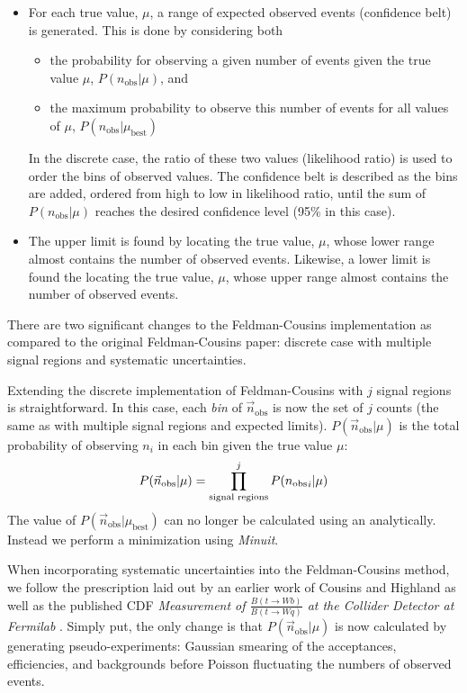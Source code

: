 \begin{itemize}

  \item For each true value, $\mu$, a range of expected observed
    events (confidence belt) is generated.  This is done by
    considering both 

    \begin{itemize}
    \item the probability for observing a given number of events given
      the true value  $\mu$, $P(n_\text{obs}|\mu)$, and

    \item the maximum probability to observe this number of events for
      all values of $\mu$, $P(n_\text{obs}|\mu_\text{best})$
    \end{itemize}

    In the discrete case, the ratio of these two values (likelihood
    ratio) is used to order the bins of observed values. The
    confidence belt is described as the bins are added, ordered from
    high to low in likelihood ratio, until the sum of
    $P(n_\text{obs}|\mu)$ reaches the desired confidence level (95\%
    in this case).

  \item The upper limit is found by locating the true value, $\mu$,
    whose lower range almost contains the number of observed events.
    Likewise, a lower limit is found the locating the true value,
    $\mu$, whose upper range almost contains the number of observed
    events.

\end{itemize}

There are two significant changes to the Feldman-Cousins
implementation as compared to the original Feldman-Cousins paper:
discrete case with multiple signal regions and systematic
uncertainties.

Extending the discrete implementation of Feldman-Cousins with $j$
signal regions is straightforward.  In this case, each {\em bin} of
$\vec{n}_\text{obs}$ is now the set of $j$ counts (the same as with
multiple signal regions and expected limits).
$P(\vec{n}_\text{obs}|\mu)$ is the total probability of observing
$n_i$ in each bin given the true value $\mu$:
  \[P(\vec{n}_\text{obs}|\mu) = \prod_\text{signal regions}^j
  P({n_\text{obs}}_i| \mu) \] The value of
  $P(\vec{n}_\text{obs}|\mu_\text{best})$ can no longer be calculated
  using an analytically.  Instead we perform a minimization using {\em
    Minuit}.


When incorporating systematic uncertainties into the Feldman-Cousins
method, we follow the prescription laid out by an earlier work of
Cousins and Highland \cite{CousinsHighland:1992ch} as well as the
published CDF {\em Measurement of $\frac{B(t\rightarrow Wb)}{B(t
    \rightarrow Wq)}$ at the Collider Detector at Fermilab}
\cite{CDF7400,Acosta:2005Branch}.  Simply put, the only
change is that $P(\vec{n}_\text{obs}|\mu)$ is now calculated by
generating pseudo-experiments: Gaussian smearing of the acceptances,
efficiencies, and backgrounds before Poisson fluctuating the numbers
of observed events.

